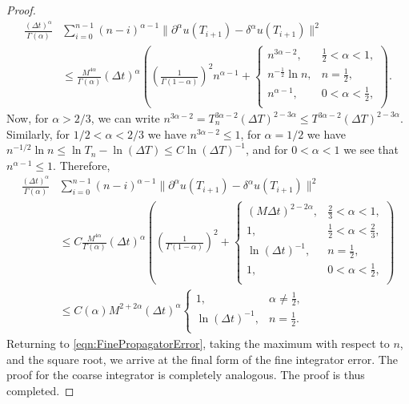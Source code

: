 \documentclass[12pt,a4paper]{article}
\begin{document}
\begin{proof}
	\begin{equation}
		\begin{split}
			\frac{(\Delta t)^\alpha}{\Gamma(\alpha)} &\sum_{i=0}^{n-1} (n-i)^{\alpha-1}  \|\partial^\alpha u(T_{i+1}) - \delta^\alpha u(T_{i+1})\|^2 \\
			&\leq \frac{M^{4\alpha}}{\Gamma(\alpha)} (\Delta t)^{\alpha}\left(
			\left(\frac{1}{\Gamma(1-\alpha)}\right)^2 n^{\alpha-1} + 
			\begin{cases}
				n^{3\alpha-2}, & \frac{1}{2}<\alpha<1, \\
				n^{-\frac{1}{2}} \ln n, & n = \frac{1}{2}, \\
				n^{\alpha-1}, & 0< \alpha < \frac{1}{2}, \\
			\end{cases}
			\right).
		\end{split}
	\end{equation}
	Now, for $\alpha > 2/3$, we can write $n^{3\alpha-2} = T_n^{3\alpha-2} (\Delta T)^{2-3\alpha} \leq  T^{3\alpha-2} (\Delta T)^{2-3\alpha}$. Similarly, for $1/2 < \alpha < 2/3$ we have $n^{3\alpha-2} \leq 1$, for $\alpha = 1/2$ we have $n^{-1/2} \ln n \leq \ln T_n - \ln (\Delta T) \leq C \ln(\Delta T)^{-1}$, and for $0<\alpha<1$ we see that $n^{\alpha-1} \leq 1$. Therefore,
	\begin{equation}
		\begin{split}
			\frac{(\Delta t)^\alpha}{\Gamma(\alpha)} &\sum_{i=0}^{n-1} (n-i)^{\alpha-1}  \|\partial^\alpha u(T_{i+1}) - \delta^\alpha u(T_{i+1})\|^2 \\
			&\leq C\frac{M^{4\alpha}}{\Gamma(\alpha)} (\Delta t)^{\alpha}\left(
			\left(\frac{1}{\Gamma(1-\alpha)}\right)^2 + 
			\begin{cases}
				(M\Delta t)^{2-2\alpha}, & \frac{2}{3} < \alpha < 1, \\
				1, & \frac{1}{2}<\alpha<\frac{2}{3}, \\
				\ln (\Delta t)^{-1}, & n = \frac{1}{2}, \\
				1, & 0< \alpha < \frac{1}{2}, \\
			\end{cases}
			\right)\\
			&\leq C(\alpha) M^{2+2\alpha} (\Delta t)^\alpha 
			\begin{cases}
				1, & \alpha \neq \frac{1}{2}, \\
				\ln (\Delta t)^{-1}, & n = \frac{1}{2}. \\
			\end{cases}
		\end{split}
	\end{equation}
	Returning to \eqref{eqn:FinePropagatorError}, taking the maximum with respect to $n$, and the square root, we arrive at the final form of the fine integrator error. The proof for the coarse integrator is completely analogous. The proof is thus completed.  
\end{proof}
\end{document}
